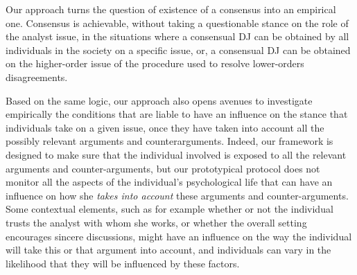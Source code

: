\documentclass[version=3.21, pagesize, twoside=off, bibliography=totoc, DIV=calc, fontsize=12pt, a4paper, french, english]{scrartcl}
\begin{document}
Our approach turns the question of existence of a consensus into an empirical one. Consensus is achievable, without taking a questionable stance on the role of the analyst issue, in the situations where a consensual \ac{DJ} can be obtained by all individuals in the society on a specific issue, or, a consensual \ac{DJ} can be obtained on the higher-order issue of the procedure used to resolve lower-orders disagreements.

Based on the same logic, our approach also opens avenues to investigate empirically the conditions that are liable to have an influence on the stance that individuals take on a given issue, once they have taken into account all the possibly relevant arguments and counterarguments. Indeed, our framework is designed to make sure that the individual involved is exposed to all the relevant arguments and counter-arguments, but our prototypical protocol does not monitor all the aspects of the individual's psychological life that can have an influence on how she \emph{takes into account} these arguments and counter-arguments. Some contextual elements, such as for example whether or not the individual trusts the analyst with whom she works, or whether the overall setting encourages sincere discussions, might have an influence on the way the individual will take this or that argument into account, and individuals can vary in the likelihood that they will be influenced by these factors. %
\end{document}
